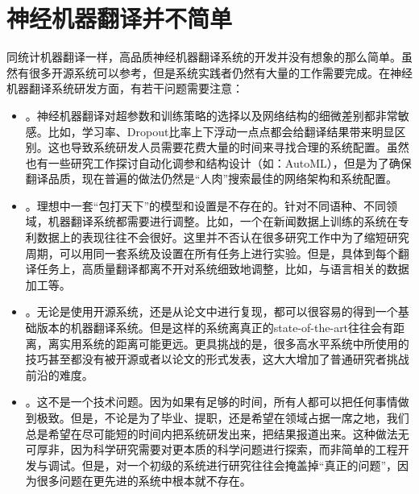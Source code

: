 \section{神经机器翻译并不简单}

\parinterval 同统计机器翻译一样，高品质神经机器翻译系统的开发并没有想象的那么简单。虽然有很多开源系统可以参考，但是系统实践者仍然有大量的工作需要完成。在神经机器翻译系统研发方面，有若干问题需要注意：

\begin{itemize}
\vspace{0.5em}
\item {\small{}}。神经机器翻译对超参数和训练策略的选择以及网络结构的细微差别都非常敏感。比如，学习率、Dropout比率上下浮动一点点都会给翻译结果带来明显区别。这也导致系统研发人员需要花费大量的时间来寻找合理的系统配置。虽然也有一些研究工作探讨自动化调参和结构设计（如：AutoML），但是为了确保翻译品质，现在普遍的做法仍然是``人肉''搜索最佳的网络架构和系统配置。
\vspace{0.5em}
\item {\small{}}。理想中一套``包打天下''的模型和设置是不存在的。针对不同语种、不同领域，机器翻译系统都需要进行调整。比如，一个在新闻数据上训练的系统在专利数据上的表现往往不会很好。这里并不否认在很多研究工作中为了缩短研究周期，可以用同一套系统及设置在所有任务上进行实验。但是，具体到每个翻译任务上，高质量翻译都离不开对系统细致地调整，比如，与语言相关的数据加工等。
\vspace{0.5em}
\item {\small{}}。无论是使用开源系统，还是从论文中进行复现，都可以很容易的得到一个基础版本的机器翻译系统。但是这样的系统离真正的state-of-the-art往往会有距离，离实用系统的距离可能更远。更具挑战的是，很多高水平系统中所使用的技巧甚至都没有被开源或者以论文的形式发表，这大大增加了普通研究者挑战前沿的难度。
\vspace{0.5em}
\item {\small{}}。这不是一个技术问题。因为如果有足够的时间，所有人都可以把任何事情做到极致。但是，不论是为了毕业、提职，还是希望在领域占据一席之地，我们总是希望在尽可能短的时间内把系统研发出来，把结果报道出来。这种做法无可厚非，因为科学研究需要对更本质的科学问题进行探索，而非简单的工程开发与调试。但是，对一个初级的系统进行研究往往会掩盖掉``真正的问题''，因为很多问题在更先进的系统中根本就不存在。
\vspace{0.5em}
\end{itemize}

